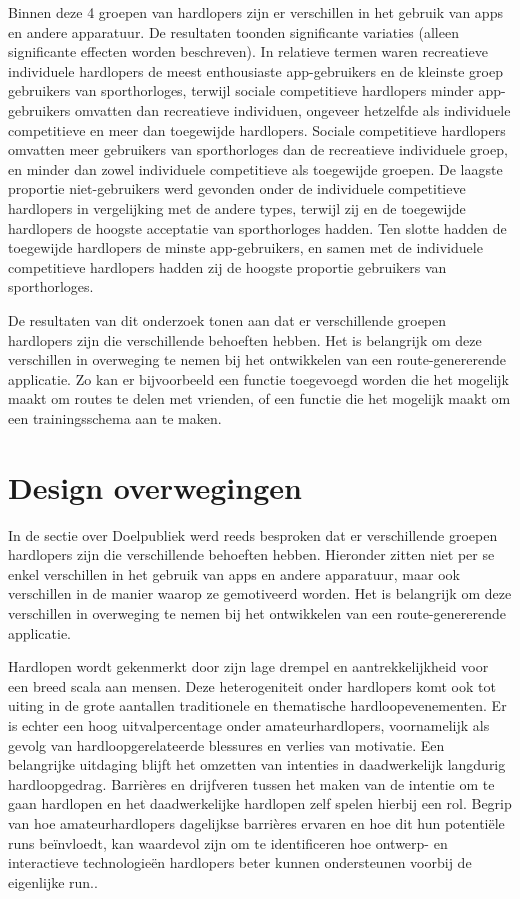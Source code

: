     Binnen deze 4 groepen van hardlopers zijn er verschillen in het gebruik van apps en andere apparatuur. 
    De resultaten toonden significante variaties (alleen significante effecten worden beschreven). 
    In relatieve termen waren recreatieve individuele hardlopers de meest enthousiaste app-gebruikers
    en de kleinste groep gebruikers van sporthorloges, terwijl sociale competitieve hardlopers minder app-gebruikers 
    omvatten dan recreatieve individuen, ongeveer hetzelfde als individuele competitieve
    en meer dan toegewijde hardlopers. Sociale competitieve hardlopers omvatten meer gebruikers van sporthorloges 
    dan de recreatieve individuele groep, en minder dan zowel individuele competitieve
    als toegewijde groepen. De laagste proportie niet-gebruikers werd gevonden 
    onder de individuele competitieve hardlopers in vergelijking met de andere types, 
    terwijl zij en de toegewijde hardlopers de hoogste acceptatie van sporthorloges hadden. 
    Ten slotte hadden de toegewijde hardlopers de minste app-gebruikers, 
    en samen met de individuele competitieve hardlopers hadden zij de hoogste proportie gebruikers van sporthorloges.


    De resultaten van dit onderzoek tonen aan dat er verschillende groepen hardlopers zijn die verschillende behoeften hebben. 
    Het is belangrijk om deze verschillen in overweging te nemen bij het ontwikkelen van een route-genererende applicatie.
    Zo kan er bijvoorbeeld een functie toegevoegd worden die het mogelijk maakt om routes te delen met vrienden,
    of een functie die het mogelijk maakt om een trainingsschema aan te maken.

    \section{Design overwegingen}

    In de sectie over Doelpubliek werd reeds besproken dat er verschillende groepen hardlopers zijn die verschillende behoeften hebben.
    Hieronder zitten niet per se enkel verschillen in het gebruik van apps en andere apparatuur, maar ook verschillen in de manier waarop ze gemotiveerd worden.
    Het is belangrijk om deze verschillen in overweging te nemen bij het ontwikkelen van een route-genererende applicatie.


    Hardlopen wordt gekenmerkt door zijn lage drempel en aantrekkelijkheid voor een breed scala aan mensen. 
    Deze heterogeniteit onder hardlopers komt ook tot uiting in de grote aantallen traditionele en thematische hardloopevenementen. 
    Er is echter een hoog uitvalpercentage onder amateurhardlopers, voornamelijk als gevolg van hardloopgerelateerde blessures en verlies van motivatie. 
    Een belangrijke uitdaging blijft het omzetten van intenties in daadwerkelijk langdurig hardloopgedrag. 
    Barrières en drijfveren tussen het maken van de intentie om te gaan hardlopen en het daadwerkelijke hardlopen zelf spelen hierbij een rol. 
    Begrip van hoe amateurhardlopers dagelijkse barrières ervaren en hoe dit hun potentiële runs beïnvloedt, kan waardevol zijn 
    om te identificeren hoe ontwerp- en interactieve technologieën hardlopers beter kunnen ondersteunen voorbij de eigenlijke run.\textcite{Menheere2020}.


